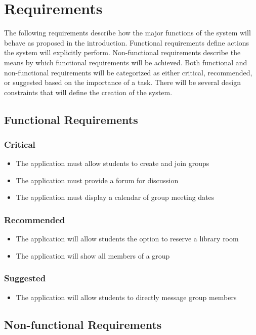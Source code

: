 \chapter{Requirements}
The following requirements describe how the major functions of the system will behave as proposed in the introduction. Functional requirements define actions the system will explicitly perform. Non-functional requirements describe the means by which functional requirements will be achieved. Both functional and non-functional requirements will be categorized as either critical, recommended, or suggested based on the importance of a task. There will be several design constraints that will define the creation of the system.

\section{Functional Requirements}
\subsection{Critical}
	\begin{itemize}
		\item The application must allow students to create and join groups
		\item The application must provide a forum for discussion
		\item The application must display a calendar of group meeting dates
	\end{itemize}
\subsection{Recommended}
	\begin{itemize}
		\item The application will allow students the option to reserve a library room
		\item The application will show all members of a group
	\end{itemize}
\subsection{Suggested}
	\begin{itemize}
		\item The application will allow students to directly message group members
	\end{itemize}

\section{Non-functional Requirements}
